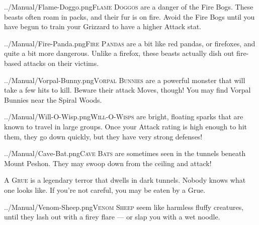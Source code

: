 \documentclass[10pt,twocolumn,openany,article]{memoir}
\begin{document}
\vspace{14pt}

\lettrine[image=true,                lines=5,               findent=3pt,
nindent=3pt]{../Manual/Flame-Doggo.png}{Flame  Doggos} are  a danger  of
the Fire  Bogs. These beasts  often roam in packs,  and their fur  is on
fire. Avoid the Fire Bogs until you have begun to train your Grizzard to
have a higher Attack stat.

\vspace{14pt}

\lettrine[image=true,                lines=5,               findent=3pt,
nindent=3pt]{../Manual/Fire-Panda.png}{Fire Pandas}  are a bit  like red
pandas, or firefoxes, and quite a  bit more dangerous. Unlike a firefox,
these beasts actually dish out fire-based attacks on their victims.

\vspace{14pt}

\lettrine[image=true,                lines=5,               findent=3pt,
nindent=3pt]{../Manual/Vorpal-Bunny.png}{Vorpal Bunnies}  are a powerful
monster that  will take a few  hits to kill. Beware  their attack Moves,
though! You may find Vorpal Bunnies near the Spiral Woods.

\ifdefined\ATARIAGESAVE\pagebreak\else\vspace{14pt}\fi

\lettrine[image=true,                lines=5,               findent=3pt,
nindent=3pt]{../Manual/Will-O-Wisp.png}{Will-O-Wisps}     are    bright,
floating sparks  that are  known to  travel in  large groups.  Once your
Attack rating is high enough to hit them, they go down quickly, but they
have very strong defenses!

\vspace{14pt}

\lettrine[image=true,                lines=5,               findent=3pt,
nindent=3pt]{../Manual/Cave-Bat.png}{Cave  Bats} are  sometimes seen  in
the tunnels beneath  Mount Peshon. They may swoop down  from the ceiling
and attack!

\vspace{14pt}

\textsc{A  Grue} is  a legendary  terror  that dwells  in dark  tunnels.
Nobody knows  what one  looks like.  If you're not  careful, you  may be
eaten by a Grue.

\vspace{14pt}

\lettrine[image=true,                lines=5,               findent=3pt,
nindent=3pt]{../Manual/Venom-Sheep.png}{Venom Sheep}  seem like harmless
fluffy creatures, until they lash out with a firey flare --- or slap you
with a wet noodle.
\end{document}
